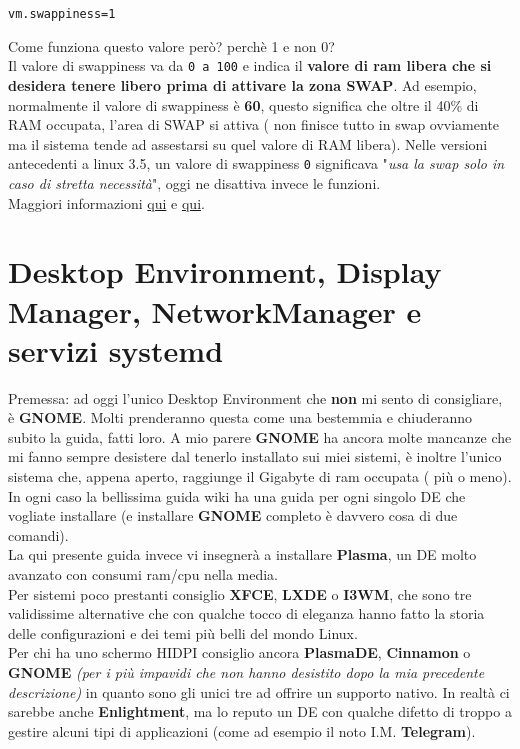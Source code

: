 \documentclass[twoside,italian]{book}
\newcommand{\centcode}[1]{
	
	\definecolor{centcode}{rgb}{0.5,0.1,0.1}
	
	\begin{center}
	 	\texttt{\textcolor{centcode}{#1}}
	\end{center}
	
	
}
\newcommand{\code}[1]{
	\texttt{\textcolor{code}{#1}}
}
\begin{document}
			\centcode{vm.swappiness=1}
			
			Come funziona questo valore però? perchè 1 e non 0?\\
			Il valore di swappiness va da \code{0 a 100} e indica il \textbf{valore di ram libera che si desidera tenere libero prima di attivare la zona SWAP}.
			Ad esempio, normalmente il valore di swappiness è \textbf{60}, questo significa che oltre il 40\% di RAM occupata, l'area di SWAP si attiva ( non finisce tutto in swap ovviamente ma il sistema tende ad assestarsi su quel valore di RAM libera).
			Nelle versioni antecedenti a linux 3.5, un valore di swappiness \code{0} significava "\textit{usa la swap solo in caso di stretta necessità}", oggi ne disattiva invece le funzioni.\\
			Maggiori informazioni \href{https://www.kernel.org/doc/Documentation/sysctl/vm.txt}{qui} e \href{https://en.wikipedia.org/wiki/Swappiness}{qui}.
			
			
					
	\chapter{Desktop Environment, Display Manager, NetworkManager e servizi systemd}

		Premessa: ad oggi l'unico Desktop Environment che \textbf{non} mi sento di consigliare, è \textbf{GNOME}. Molti prenderanno questa come una bestemmia e chiuderanno subito la guida, fatti loro. A mio parere \textbf{GNOME} ha ancora molte mancanze che mi fanno sempre desistere dal tenerlo installato sui miei sistemi, è inoltre l'unico sistema che, appena aperto, raggiunge il Gigabyte di ram occupata ( più o meno). In ogni caso la bellissima guida wiki ha una guida per ogni singolo DE che vogliate installare (e installare \textbf{GNOME} completo è davvero cosa di due comandi).\\
		La qui presente guida invece vi insegnerà a installare \textbf{Plasma}, un DE molto avanzato con consumi ram/cpu nella media.\\ Per sistemi poco prestanti consiglio \textbf{XFCE}, \textbf{LXDE} o \textbf{I3WM}, che sono tre validissime alternative che con qualche tocco di eleganza hanno fatto la storia delle configurazioni e dei temi più belli del mondo Linux.\\
		 Per chi ha uno schermo HIDPI consiglio ancora \textbf{PlasmaDE}, \textbf{Cinnamon} o \textbf{GNOME} \textit{(per i più impavidi che non hanno desistito dopo la mia precedente descrizione)} in quanto sono gli unici tre ad offrire un supporto nativo. In realtà ci sarebbe anche \textbf{Enlightment}, ma lo reputo un DE con qualche difetto di troppo a gestire alcuni tipi di applicazioni (come ad esempio il noto I.M. \textbf{Telegram}).
		 
\end{document}

